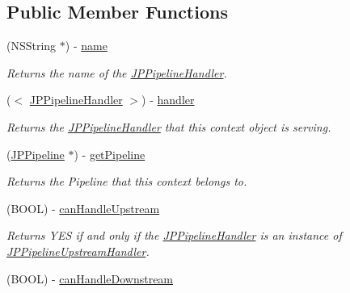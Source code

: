 \subsection*{Public Member Functions}
\begin{DoxyCompactItemize}
\item 
\hypertarget{a00030_a8ac82545de840af4ed91e99ed6b8ecb2}{
(NSString $\ast$) -\/ \hyperlink{a00030_a8ac82545de840af4ed91e99ed6b8ecb2}{name}}
\label{a00030_a8ac82545de840af4ed91e99ed6b8ecb2}

\begin{DoxyCompactList}\small\item\em Returns the name of the \hyperlink{a00029}{JPPipelineHandler}. \item\end{DoxyCompactList}\item 
\hypertarget{a00030_a9cf37145f1fe22cbeb44c8848efc5d47}{
($<$ \hyperlink{a00029}{JPPipelineHandler} $>$) -\/ \hyperlink{a00030_a9cf37145f1fe22cbeb44c8848efc5d47}{handler}}
\label{a00030_a9cf37145f1fe22cbeb44c8848efc5d47}

\begin{DoxyCompactList}\small\item\em Returns the \hyperlink{a00029}{JPPipelineHandler} that this context object is serving. \item\end{DoxyCompactList}\item 
\hypertarget{a00030_a19bb45818df9ae3674732158f8d1cfd9}{
(\hyperlink{a00019}{JPPipeline} $\ast$) -\/ \hyperlink{a00030_a19bb45818df9ae3674732158f8d1cfd9}{getPipeline}}
\label{a00030_a19bb45818df9ae3674732158f8d1cfd9}

\begin{DoxyCompactList}\small\item\em Returns the Pipeline that this context belongs to. \item\end{DoxyCompactList}\item 
\hypertarget{a00030_a281202727bd690735f98851db6dd3d48}{
(BOOL) -\/ \hyperlink{a00030_a281202727bd690735f98851db6dd3d48}{canHandleUpstream}}
\label{a00030_a281202727bd690735f98851db6dd3d48}

\begin{DoxyCompactList}\small\item\em Returns YES if and only if the \hyperlink{a00029}{JPPipelineHandler} is an instance of \hyperlink{a00035}{JPPipelineUpstreamHandler}. \item\end{DoxyCompactList}\item 
\hypertarget{a00030_a4265a40ae2f3f6367a1fdfe7efe00fa6}{
(BOOL) -\/ \hyperlink{a00030_a4265a40ae2f3f6367a1fdfe7efe00fa6}{canHandleDownstream}}
\label{a00030_a4265a40ae2f3f6367a1fdfe7efe00fa6}


\end{DoxyCompactItemize}
